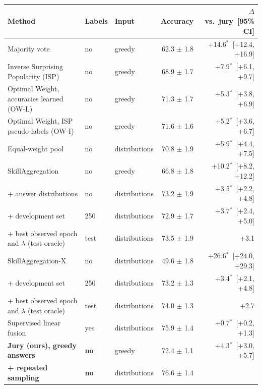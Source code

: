 \begin{tabular}{lllrr}
\toprule
Method & Labels & Input & Accuracy & $\Delta$ vs.\ jury~[95\% CI] \\
\midrule
Majority vote & no & greedy & 62.3 $\pm$ 1.8 & +14.6$^{*}$~[+12.4, +16.9] \\
Inverse Surprising Popularity (ISP) & no & greedy & 68.9 $\pm$ 1.7 & +7.9$^{*}$~[+6.1, +9.7] \\
Optimal Weight, accuracies learned (OW-L) & no & greedy & 71.3 $\pm$ 1.7 & +5.3$^{*}$~[+3.8, +6.9] \\
Optimal Weight, ISP pseudo-labels (OW-I) & no & greedy & 71.6 $\pm$ 1.6 & +5.2$^{*}$~[+3.6, +6.7] \\
Equal-weight pool & no & distributions & 70.8 $\pm$ 1.9 & +5.9$^{*}$~[+4.4, +7.5] \\
\midrule
SkillAggregation~\cite{sun-etal-2025-skillaggregation} & no & greedy & 66.8 $\pm$ 1.8 & +10.2$^{*}$~[+8.2, +12.2] \\
\quad + answer distributions & no & distributions & 73.2 $\pm$ 1.9 & +3.5$^{*}$~[+2.2, +4.8] \\
\quad\quad + development set & 250 & distributions & 72.9 $\pm$ 1.7 & +3.7$^{*}$~[+2.4, +5.0] \\
\quad\quad + best observed epoch and $\lambda$ (test oracle) & test & distributions & 73.5 $\pm$ 1.9 & +3.1 \\
SkillAggregation-X~\cite{sun-etal-2025-skillaggregation} & no & distributions & 49.6 $\pm$ 1.8 & +26.6$^{*}$~[+24.0, +29.3] \\
\quad + development set & 250 & distributions & 73.2 $\pm$ 1.3 & +3.4$^{*}$~[+2.1, +4.8] \\
\quad + best observed epoch and $\lambda$ (test oracle) & test & distributions & 74.0 $\pm$ 1.3 & +2.7 \\
\midrule
Supervised linear fusion & yes & distributions & 75.9 $\pm$ 1.4 & +0.7$^{*}$~[+0.2, +1.3] \\
\textbf{Jury (ours), greedy answers} & \textbf{no} & greedy & 72.4 $\pm$ 1.1 & +4.3$^{*}$~[+3.0, +5.7] \\
\textbf{\quad + repeated sampling} & \textbf{no} & distributions & 76.6 $\pm$ 1.4 &  \\
\bottomrule
\end{tabular}
